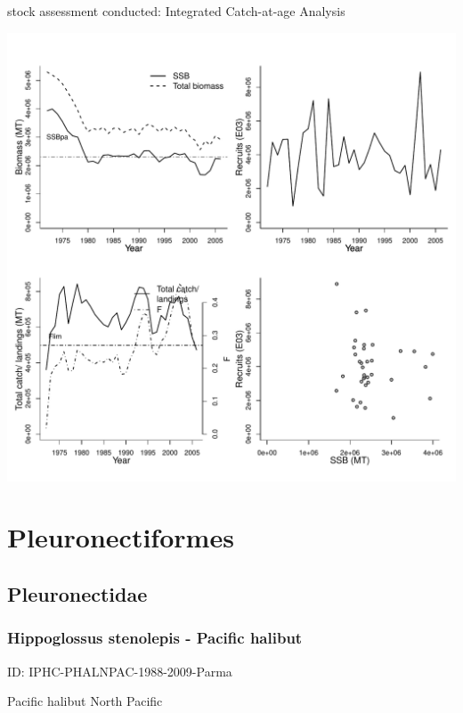 stock assessment conducted: Integrated Catch-at-age Analysis 
\begin{center}
\vspace{-0.2cm}\includegraphics[scale=0.65]{../tex/figures/plot-WGMHSA-MACKNEICES-1972-2007-JENNINGS.pdf}
\end{center}

\newpage
\section{Pleuronectiformes}

\subsection{Pleuronectidae}

\subsubsection{Hippoglossus stenolepis - Pacific halibut}
ID: IPHC-PHALNPAC-1988-2009-Parma

Pacific halibut North Pacific 

